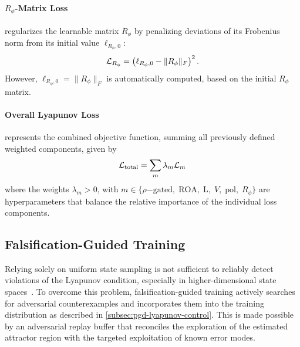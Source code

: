 \paragraph{$R_\phi$-Matrix Loss} regularizes the learnable matrix $R_\phi$ by penalizing deviations 
of its Frobenius norm from its initial value $\ell_{R_\phi,0}$:
\begin{equation}
    \label{eq:r-matrix-loss}
    \mathcal{L}_{R_\phi} = \left( \ell_{R_\phi,0} - \lVert R_\phi \rVert_F \right)^2.
\end{equation}
However, $\ell_{R_\phi,0} = \lVert R_\phi \rVert_F$ is automatically computed, 
based on the initial $R_\phi$ matrix.


\paragraph{Overall Lyapunov Loss} represents the combined objective function, 
summing all previously defined weighted components, given by 
\begin{equation}
    \label{eq:combined-loss}
    \mathcal{L}_{\mathrm{total}} = \sum_{m}
        \lambda_m \mathcal{L}_m
\end{equation}
where the weights $\lambda_m > 0$, with $m \in \{ \rho\mathrm{-gated},\;\mathrm{ROA},\;\mathrm{L},\;V,\;\mathrm{pol},\;R_\phi \}$ are 
hyperparameters that balance the relative importance of the individual loss components. 



\subsection{Falsification-Guided Training}
\label{subsec:fals-guided-training}
Relying solely on uniform state sampling is not sufficient to reliably detect violations of the Lyapunov condition, 
especially in higher-dimensional state spaces~\cite{yangLyapunovstableNeuralControl2024}. To overcome this problem, falsification-guided training 
actively searches for adversarial counterexamples and incorporates them into the training distribution as described in 
\cref{subsec:pgd-lyapunov-control}. This is made possible by an adversarial replay buffer that reconciles the exploration of the 
estimated attractor region with the targeted exploitation of known error modes.


